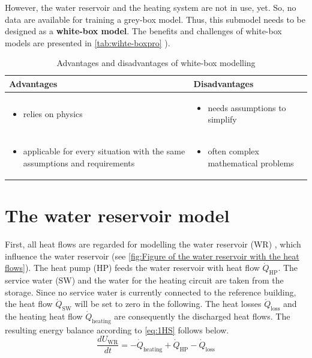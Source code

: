     \newline
    However, the water reservoir and the heating system are not in use, yet. So, no data are available for training a grey-box model. Thus, this submodel needs to be designed as a \textbf{white-box model}.
    \newline
    The benefits and challenges of white-box models are presented in \autoref{tab:wihte-boxpro} \cite{EstradaFlores.2006}).
    \begin{table}[h!]
        \centering
        \begin{tabular}{p{7.3cm} | p{7.3cm}}
        \hline
          Advantages  &  Disadvantages\\
        \hline
        \begin{itemize}
            \item relies on physics
        \end{itemize}
      & \begin{itemize}
            \item needs assumptions to simplify 
        \end{itemize}\\
     \begin{itemize}
            \item applicable for every situation with the same assumptions and requirements 
        \end{itemize} & \begin{itemize}
            \item often complex mathematical problems
        \end{itemize}\\
        \end{tabular}
        \caption {Advantages and disadvantages of white-box modelling}
        \label{tab:wihte-boxpro}
    \end{table}

    \section{The water reservoir model}
    \label{waterModel}
    First, all heat flows are regarded for modelling the water reservoir (WR)  , which influence the water reservoir (see \autoref{fig:Figure of the water reservoir with the heat flows}). The heat pump (HP)  feeds the water reservoir with heat flow $\dot{Q}_\text{HP}$. The service water (SW)  and the water for the heating circuit are taken from the storage. Since no service water is currently connected to the reference building, the heat flow $\dot{Q}_\text{SW}$ will be set to zero in the following. The heat losses $\dot{Q}_\text{loss}$ and the heating heat flow  $\dot{Q}_\text{heating}$ are consequently the discharged heat flows. The resulting energy balance according to \autoref{eq:1HS} follows below.
    \begin{equation}
        \label{waterReservoir}
        \frac{d U_\text{WR}}{d t}= -\dot{Q}_\text{heating} + \dot{Q}_\text{HP} - \dot{Q}_\text{loss}
    \end{equation}
    
